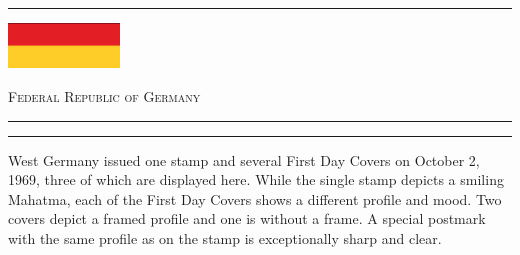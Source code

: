 \documentclass[a4paper]{article}
\begin{document}
\hrule
\vspace{8pt}
\begin{minipage}{2cm}
  \includegraphics[height=1.2cm]{images/de}
\end{minipage}
\hfill
{\scshape\huge Federal Republic of Germany}
\vspace{8pt}
\hrule
\vspace{14cm}
\hfill
\begin{minipage}{8cm} \hrule \vspace{12pt} West Germany issued one
  stamp and several First Day Covers on October 2, 1969, three of
  which are displayed here. While the single stamp depicts a smiling
  Mahatma, each of the First Day Covers shows a different profile and
  mood. Two covers depict a framed profile and one is without a
  frame. A special postmark with the same profile as on the stamp is
  exceptionally sharp and clear.
\end{minipage}
\end{document}
